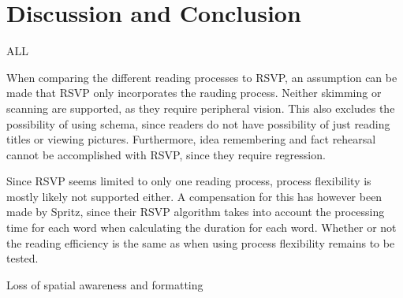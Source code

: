 \section{Discussion and Conclusion}
ALL

When comparing the different reading processes to RSVP, an assumption can be made that RSVP only incorporates the rauding process. Neither skimming or scanning are supported, as they require peripheral vision. This also excludes the possibility of using schema, since readers do not have possibility of just reading titles or viewing pictures. Furthermore, idea remembering and fact rehearsal cannot be accomplished with RSVP, since they require regression. 

Since RSVP seems limited to only one reading process, process flexibility is mostly likely not supported either. A compensation for this has however been made by Spritz, since their RSVP algorithm takes into account the processing time for each word when calculating the duration for each word. Whether or not the reading efficiency is the same as when using process flexibility remains to be tested.

Loss of spatial awareness and formatting
